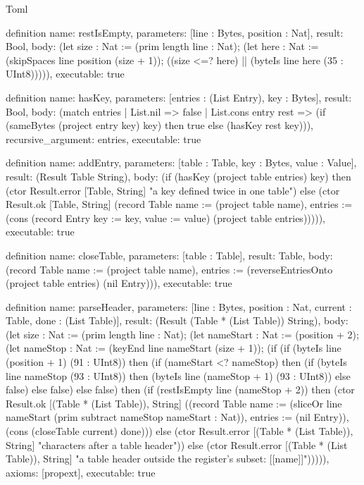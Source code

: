 \begin{lexlean}{Toml}
\begin{semanticmodule}
definition{
  name: restIsEmpty,
  parameters: [line : Bytes, position : Nat],
  result: Bool,
  body: (let size : Nat := (prim length line : Nat); (let here : Nat := (skipSpaces line position (size + 1)); ((size <=? here) || (byteIs line here (35 : UInt8))))),
  executable: true
}

definition{
  name: hasKey,
  parameters: [entries : (List Entry), key : Bytes],
  result: Bool,
  body: (match entries
    | List.nil => false
    | List.cons entry rest => (if (sameBytes (project entry key) key) then true else (hasKey rest key))),
  recursive_argument: entries,
  executable: true
}

definition{
  name: addEntry,
  parameters: [table : Table, key : Bytes, value : Value],
  result: (Result Table String),
  body: (if (hasKey (project table entries) key) then (ctor Result.error [Table, String] "a key defined twice in one table") else (ctor Result.ok [Table, String] (record Table {name := (project table name), entries := (cons (record Entry {key := key, value := value}) (project table entries))}))),
  executable: true
}

definition{
  name: closeTable,
  parameters: [table : Table],
  result: Table,
  body: (record Table {name := (project table name), entries := (reverseEntriesOnto (project table entries) (nil Entry))}),
  executable: true
}

definition{
  name: parseHeader,
  parameters: [line : Bytes, position : Nat, current : Table, done : (List Table)],
  result: (Result (Table * (List Table)) String),
  body: (let size : Nat := (prim length line : Nat); (let nameStart : Nat := (position + 2); (let nameStop : Nat := (keyEnd line nameStart (size + 1)); (if (if (byteIs line (position + 1) (91 : UInt8)) then (if (nameStart <? nameStop) then (if (byteIs line nameStop (93 : UInt8)) then (byteIs line (nameStop + 1) (93 : UInt8)) else false) else false) else false) then (if (restIsEmpty line (nameStop + 2)) then (ctor Result.ok [(Table * (List Table)), String] ((record Table {name := (sliceOr line nameStart (prim subtract nameStop nameStart : Nat)), entries := (nil Entry)}), (cons (closeTable current) done))) else (ctor Result.error [(Table * (List Table)), String] "characters after a table header")) else (ctor Result.error [(Table * (List Table)), String] "a table header outside the register's subset: [[name]]"))))),
  axioms: [propext],
  executable: true
}


\end{semanticmodule}
\end{lexlean}
